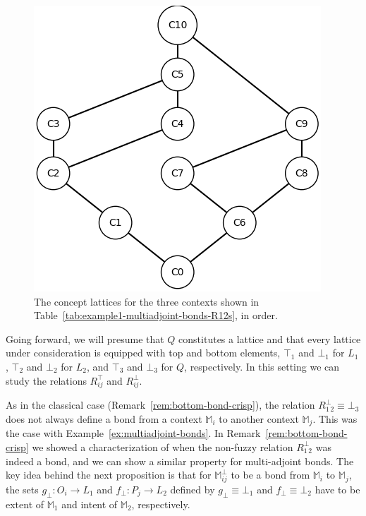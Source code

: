 \documentclass[runningheads,a4paper]{llncs}
\newcommand{\M}{\mathbb{M}}
\begin{document}
\begin{example}
\begin{figure}
\begin{minipage}{0.3\textwidth}
	\end{minipage}
	\begin{minipage}{0.3\textwidth}
		\centering
		\includegraphics[width = \textwidth]{im/ex-ma2-R1+R2 (bot).png}
	\end{minipage}
	\caption{The concept lattices for the three contexts shown in Table~\ref{tab:example1-multiadjoint-bonds-R12s}, in order.}
	\label{fig:example1-multiadjoint-bonds-concept-lattices}
\end{figure}

\end{example}

Going forward, we will presume that $Q$ constitutes a lattice and that every lattice under consideration is equipped with top and bottom elements, $\top_1$ and $\bot_1$ for $L_1$, $\top_2$ and $\bot_2$ for $L_2$, and $\top_3$ and $\bot_3$ for $Q$, respectively. In this setting we can study the relations $R_{ij}^\top$ and $R_{ij}^\bot$.

As in the classical case (Remark~\ref{rem:bottom-bond-crisp}), the relation $R_{1\,2}^\bot \equiv \bot_3$ does not always define a bond from a context $\M_i$ to another context $\M_j$. This was the case with Example~\ref{ex:multiadjoint-bonds}. In Remark~\ref{rem:bottom-bond-crisp} we showed a characterization of when the non-fuzzy relation $R_{1\,2}^\bot$ was indeed a bond, and we can show a similar property for multi-adjoint bonds. The key idea behind the next proposition is that for $\M_{ij}^\bot$ to be a bond from $\M_i$ to $\M_j$, the sets $g_\bot \colon O_i \to L_1$ and $f_\bot \colon P_j \to L_2$ defined by $g_\bot \equiv \bot_1$ and $f_\bot \equiv \bot_2$ have to be extent of $\M_1$ and intent of $\M_2$, respectively.
\end{document}
